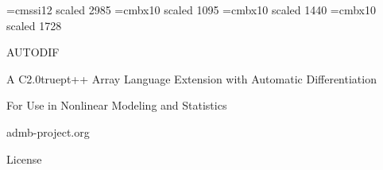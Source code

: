 \font\halfinch=cmssi12 scaled 2985
\font\smallheadfont=cmbx10 scaled 1095
\font\largeheadfont=cmbx10 scaled 1440
\font\hugeheadfont=cmbx10 scaled 1728

\vspace*{2in}
{\hugeheadfont
\centerline{\halfinch AUTODIF}}
\vspace{0.5in}
{\largeheadfont
\centerline{A C\raise2.0truept\hbox{\smallheadfont ++} Array Language Extension with Automatic Differentiation}
\bigskip
\centerline{For Use in Nonlinear Modeling and Statistics}
\vspace{0.5in}
\centerline{admb-project.org}}

\vfill
\eject

\centerline{\LARGE License}


\twelverm
\vfil
\supereject


